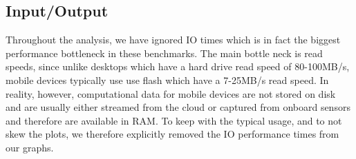 \subsection{Input/Output}

Throughout the analysis, we have ignored IO times which is in fact the biggest performance bottleneck in these benchmarks.
The main bottle neck is read speeds, since unlike desktops which have a hard drive read speed of 80-100MB/s, mobile devices typically use use flash which have a 7-25MB/s read speed.
In reality, however, computational data for mobile devices are not stored on disk and are usually either streamed from the cloud or captured from onboard sensors and therefore are available in RAM.
To keep with the typical usage, and to not skew the plots, we therefore explicitly removed the IO performance times from our graphs.
